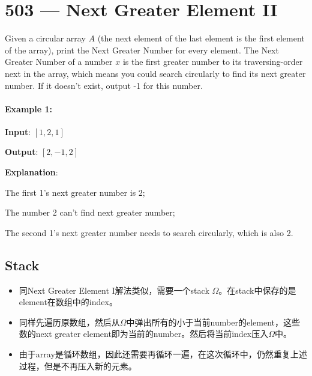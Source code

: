 \section{503 --- Next Greater Element II}
Given a circular array $A$ (the next element of the last element is the first element of the array), print the Next Greater Number for every element. The Next Greater Number of a number $x$ is the first greater number to its traversing-order next in the array, which means you could search circularly to find its next greater number. If it doesn't exist, output -1 for this number.

\paragraph{Example 1:}
\begin{flushleft}
\textbf{Input}: $[1,2,1]$

\textbf{Output}: $[2,-1,2]$

\textbf{Explanation}: 

The first 1's next greater number is 2; 

The number 2 can't find next greater number; 

The second 1's next greater number needs to search circularly, which is also 2.
\end{flushleft}

\subsection{Stack}
\begin{itemize}
\item 同Next Greater Element I解法类似，需要一个stack $\Omega$。在stack中保存的是element在数组中的index。
\item 同样先遍历原数组，然后从$\Omega$中弹出所有的小于当前number的element，这些数的next greater element即为当前的number。然后将当前index压入$\Omega$中。
\item 由于array是循环数组，因此还需要再循环一遍，在这次循环中，仍然重复上述过程，但是不再压入新的元素。
\end{itemize}

